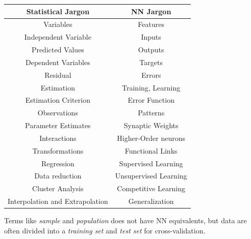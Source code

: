 \documentclass[10pt,a4paper]{article}
\begin{document}
\begin{center}
	\begin{tabular}{|c|c|}
		\hline 
		\textbf{Statistical Jargon} & \textbf{NN Jargon} \\ 
		\hline 
		Variables & Features \\ 
		\hline 
		Independent Variable & Inputs \\ 
		\hline 
		Predicted Values & Outputs \\ 
		\hline 
		Dependent Variables & Targets \\ 
		\hline 
		Residual & Errors \\ 
		\hline 
		Estimation & Training, Learning \\ 
		\hline 
		Estimation Criterion & Error Function \\ 
		\hline 
		Observations & Patterns \\ 
		\hline 
		Parameter Estimates & Synaptic Weights \\ 
		\hline 
		Interactions & Higher-Order neurons \\ 
		\hline 
		Transformations & Functional Links \\ 
		\hline 
		Regression & Supervised Learning \\ 
		\hline 
		Data reduction & Unsupervised Learning \\ 
		\hline 
		Cluster Analysis & Competitive Learning \\ 
		\hline 
		Interpolation and Extrapolation & Generalization \\ 
		\hline 
	\end{tabular}\end{center}
	Terms like \emph{sample} and \emph{population} does not have NN equivalents, but data are often divided into a \emph{training set} and \emph{test set} for cross-validation.
\end{document}
